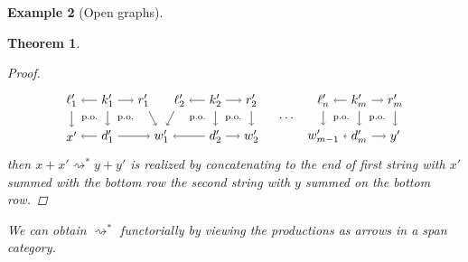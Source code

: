 \documentclass{amsart}
\newcommand{\deriv}[2]{#1 \rightsquigarrow^\ast #2}
\newtheorem{theorem}{Theorem}[section]
\theoremstyle{remark}
\theoremstyle{definition}
\newtheorem{example}[theorem]{Example}
\begin{document}
\begin{example}[Open graphs]
{{\begin{theorem}
\begin{proof}
\[\begin{tikzpicture}
      \node (1t) at (0,1) {$ \ell'_1 $};
      \node (2t) at (1,1) {$ k'_1 $};
      \node (3t) at (2,1) {$ r'_1 $};
      \node (4t) at (3,1) {$ \ell'_2 $};
      \node (5t) at (4,1) {$ k'_2 $};
      \node (6t) at (5,1) {$ r'_2 $};
      \node (7t) at (7,1) {$ \ell'_n $};
      \node (8t) at (8,1) {$ k'_m $};
      \node (9t) at (9,1) {$ r'_m $};
      \node (1b) at (0,0) {$ x' $};
      \node (2b) at (1,0) {$ d'_1 $};
      \node (3b) at (2.5,0) {$ w'_1 $};
      \node (4b) at (4,0) {$ d'_2 $};
      \node (5b) at (5,0) {$ w'_2 $};
      \node (6b) at (7,0) {$ w'_{m-1} $};
      \node (7b) at (8,0) {$ d'_m $};
      \node (8b) at (9,0) {$ y' $};
      \draw [->] (2t) to node [] {\scriptsize{$  $}} (1t);
      \draw [->] (2t) to node [] {\scriptsize{$  $}} (3t);
      \draw [->] (5t) to node [] {\scriptsize{$  $}} (4t);
      \draw [->] (5t) to node [] {\scriptsize{$  $}} (6t);
      \draw [->] (8t) to node [] {\scriptsize{$  $}} (7t);
      \draw [->] (8t) to node [] {\scriptsize{$  $}} (9t);
      \draw [->] (2b) to node [] {\scriptsize{$  $}} (1b);
      \draw [->] (2b) to node [] {\scriptsize{$  $}} (3b);
      \draw [->] (4b) to node [] {\scriptsize{$  $}} (3b);
      \draw [->] (4b) to node [] {\scriptsize{$  $}} (5b);
      \draw [->] (7b) to node [] {\scriptsize{$  $}} (6b);
      \draw [->] (7b) to node [] {\scriptsize{$  $}} (8b);
      \draw [->] (1t) to node [] {\scriptsize{$  $}} (1b);
      \draw [->] (2t) to node [] {\scriptsize{$  $}} (2b);
      \draw [->] (3t) to node [] {\scriptsize{$  $}} (3b);
      \draw [->] (4t) to node [] {\scriptsize{$  $}} (3b);
      \draw [->] (5t) to node [] {\scriptsize{$  $}} (4b);
      \draw [->] (6t) to node [] {\scriptsize{$  $}} (5b);
      \draw [->] (7t) to node [] {\scriptsize{$  $}} (6b);
      \draw [->] (8t) to node [] {\scriptsize{$  $}} (7b);
      \draw [->] (9t) to node [] {\scriptsize{$  $}} (8b);
      \node () at (6,0.5) {$ \dotsm $};
      \node () at (0.5,0.5) {\scriptsize{p.o.}};
      \node () at (1.5,0.5) {\scriptsize{p.o.}};
      \node () at (3.5,0.5) {\scriptsize{p.o.}};
      \node () at (4.5,0.5) {\scriptsize{p.o.}};
      \node () at (7.5,0.5) {\scriptsize{p.o.}};
      \node () at (8.5,0.5) {\scriptsize{p.o.}};
    \end{tikzpicture}
  \]
  then $ \deriv{x+x'}{y+y'} $ is realized by concatenating to the end
  of first string with $ x' $ summed with the bottom row the second
  string with $ y $ summed on the bottom row.
\end{proof}

We can obtain $ \deriv{}{} $ functorially by viewing the productions
as arrows in a span category.


\end{theorem}}}
\end{example}
\end{document}
